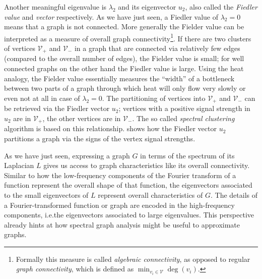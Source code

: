 Another meaningful eigenvalue is $\lambda_2$ and its eigenvector $u_2$, also called the \textit{Fiedler value} and \textit{vector} respectively.
As we have just seen, a Fiedler value of $\lambda_2 = 0$ means that a graph is not connected.
More generally the Fielder value can be interpreted as a measure of overall graph connectivity\footnote{%
	Formally this measure is called \textit{algebraic connectivity}, as opposed to regular \textit{graph connectivity}, which is defined as $\min_{v_i \in \mathcal{V}} \deg(v_i)$.
}.
If there are two clusters of vertices $\mathcal{V}_+$ and $\mathcal{V}_-$ in a graph that are connected via relatively few edges (compared to the overall number of edges), the Fielder value is small;
for well connected graphs on the other hand the Fiedler value is large.
Using the heat analogy, the Fielder value essentially measures the ``width'' of a bottleneck between two parts of a graph through which heat will only flow very slowly or even not at all in case of $\lambda_2 = 0$.
The partitioning of vertices into $\mathcal{V}_+$ and $\mathcal{V}_-$ can be retrieved via the Fiedler vector $u_2$;
vertices with a positive signal strength in $u_2$ are in $\mathcal{V}_+$, the other vertices are in $\mathcal{V}_-$.
The so called \textit{spectral clustering} algorithm is based on this relationship.
 shows how the Fiedler vector $u_2$ partitions a graph via the signs of the vertex signal strengths.

As we have just seen, expressing a graph $G$ in terms of the spectrum of its Laplacian $L$ gives us access to graph characteristics like its overall connectivity.
Similar to how the low-frequency components of the Fourier transform of a function represent the overall shape of that function, the eigenvectors associated to the small eigenvectors of $L$ represent overall characteristics of $G$.
The details of a Fourier-transformed function or graph are encoded in the high-frequency components, i.e.\@ the eigenvectors associated to large eigenvalues.
This perspective already hints at how spectral graph analysis might be useful to approximate graphs.
